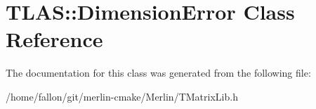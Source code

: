 \hypertarget{classTLAS_1_1DimensionError}{}\section{T\+L\+AS\+:\+:Dimension\+Error Class Reference}
\label{classTLAS_1_1DimensionError}


The documentation for this class was generated from the following file\+:\begin{DoxyCompactItemize}
\item 
/home/fallon/git/merlin-\/cmake/\+Merlin/T\+Matrix\+Lib.\+h\end{DoxyCompactItemize}
